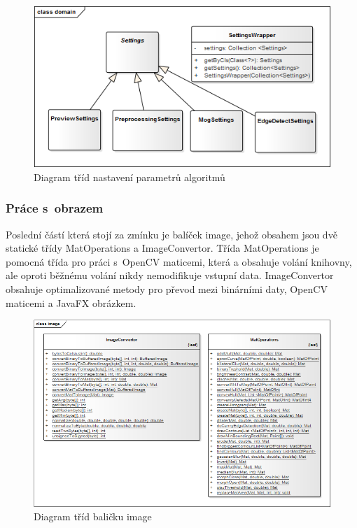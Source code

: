     \begin{figure}[h]
      \centering
      \includegraphics[width=1\textwidth]{images/ea_class_settings.png}
      \caption{Diagram tříd nastavení parametrů algoritmů}
      \label{fig:ea_settings}
    \end{figure} 

	\subsubsection{Práce s~obrazem}
    Poslední částí která stojí za zmínku je balíček image, jehož obsahem jsou dvě statické třídy MatOperations a ImageConvertor. Třída MatOperations je pomocná třída pro práci s~OpenCV maticemi, která a obsahuje volání knihovny, ale oproti běžnému volání nikdy nemodifikuje vstupní data. ImageConvertor obsahuje optimalizované metody pro převod mezi binárními daty, OpenCV maticemi a JavaFX obrázkem.

    \begin{figure}[h]
      \centering
      \includegraphics[width=1\textwidth]{images/ea_class_image.png}
      \caption{Diagram tříd baličku image}
      \label{fig:flir_binary_viewer}
    \end{figure} 


